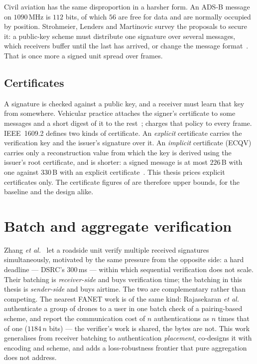 Civil aviation has the same disproportion in a harsher form. An ADS-B message on $1090$\,MHz
is $112$ bits, of which $56$ are free for data and are normally occupied by position.
Strohmeier, Lenders and Martinovic survey the proposals to secure it: a public-key scheme must
distribute one signature over several messages, which receivers buffer until the last has
arrived, or change the message format~\cite{strohmeier2015adsb}. That is once more a signed
unit spread over frames.


\subsection{Certificates}

A signature is checked against a public key, and a receiver must learn that key from somewhere.
Vehicular practice attaches the signer's certificate to some messages and a short digest of it
to the rest~\cite{etsi_ts103097,ndss2024pqv2v};  charges that policy to every
frame. IEEE~1609.2 defines two kinds of certificate. An \emph{explicit} certificate carries the
verification key and the issuer's signature over it. An \emph{implicit} certificate (ECQV)
carries only a reconstruction value from which the key is derived using the issuer's root
certificate, and is shorter: a signed message is at most $226$\,B with one against $330$\,B with
an explicit certificate~\cite{ndss2024pqv2v}. This thesis prices explicit certificates only. The
certificate figures of  are therefore upper bounds, for the baseline and the
design alike.

\section{Batch and aggregate verification}\label{sec:bg-batch}

Zhang \emph{et al.}~\cite{zhang2008batch} let a roadside unit verify multiple received signatures
simultaneously, motivated by the same pressure from the opposite side: a hard deadline --- DSRC's
$300$\,ms --- within which sequential verification does not scale. Their batching is
\emph{receiver-side} and buys verification time; the batching in this thesis is \emph{sender-side}
and buys airtime. The two are complementary rather than competing. The nearest FANET work is
of the same kind: Rajasekaran \emph{et al.}~\cite{rajasekaran2022batchfanet} authenticate a
group of drones to a user in one batch check of a pairing-based scheme, and report the communication cost of
$n$ authentications as $n$ times that of one ($1184\,n$ bits) --- the verifier's work is
shared, the bytes are not. This work generalises from
receiver batching to authentication \emph{placement}, co-designs it with encoding and scheme, and
adds a loss-robustness frontier that pure aggregation does not address.

